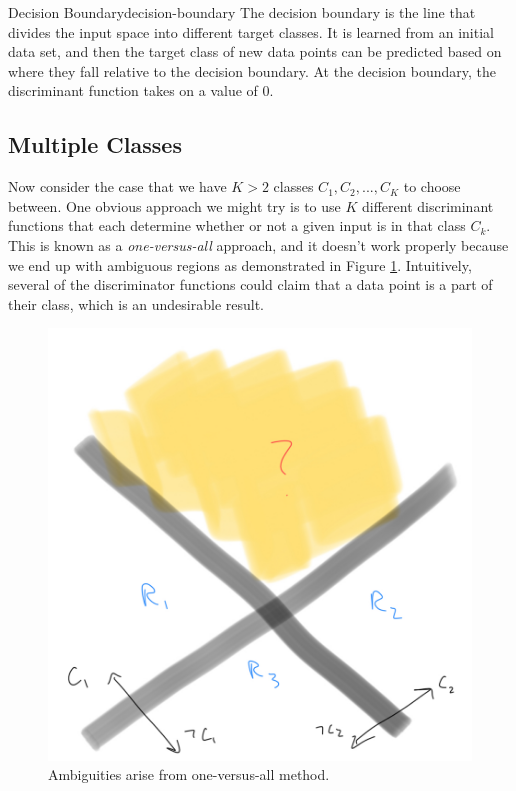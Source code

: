 \begin{definition}{Decision Boundary}{decision-boundary}
	The decision boundary is the line that divides the input space into different target classes. It is learned from an initial data set, and then the target class of new data points can be predicted based on where they fall relative to the decision boundary. At the decision boundary, the discriminant function takes on a value of 0.
\end{definition}


\subsection{Multiple Classes}
Now consider the case that we have $K > 2$ classes $C_{1}, C_{2}, ..., C_{K}$ to choose between. One obvious approach we might try is to use $K$ different discriminant functions that each determine whether or not a given input is in that class $C_{k}$. This is known as a \textit{one-versus-all} approach, and it doesn't work properly because we end up with ambiguous regions as demonstrated in Figure \ref{fig:one-vs-all-ambig}. Intuitively, several of the discriminator functions could claim that a data point is a part of their class, which is an undesirable result.

\begin{figure}
    \centering
    \includegraphics[width=0.5\paperwidth]{../Classification/fig/one_vs_all_ambig_ipad.jpg}
    \caption{Ambiguities arise from one-versus-all method.}
    \label{fig:one-vs-all-ambig}
\end{figure}

